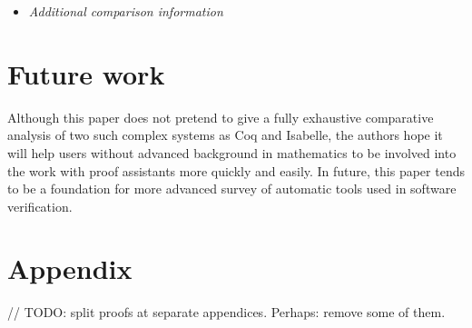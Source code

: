 \documentclass[article]{aaltoseries}
\begin{document}
\begin{itemize}
  \item \textit{Additional comparison information}
      
    
  
\end{itemize}



\section{Future work}
\label{sec:future_work}

Although this paper does not pretend to give a fully exhaustive comparative analysis of two such complex systems as Coq and Isabelle, the authors hope it will help users without advanced background in mathematics to be involved into the work with proof assistants more quickly and easily. In future, this paper tends to be a foundation for more advanced survey of automatic tools used in software verification.






\newpage
\appendix 
\section{Appendix}

// TODO: split proofs at separate appendices. Perhaps: remove some of them.

\label{appx_diff_table}
\end{document}
